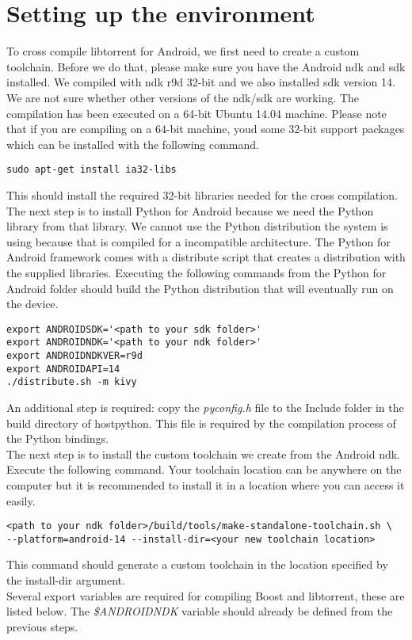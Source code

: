 \section{Setting up the environment}
	To cross compile libtorrent for Android, we first need to create a custom toolchain. Before we do that, please make sure you have the Android ndk and sdk installed. We compiled with ndk r9d 32-bit and we also installed sdk version 14. We are not sure whether other versions of the ndk/sdk are working. The compilation has been executed on a 64-bit Ubuntu 14.04 machine. Please note that if you are compiling on a 64-bit machine, youd some 32-bit support packages which can be installed with the following command.
	\begin{lstlisting}
sudo apt-get install ia32-libs
	\end{lstlisting}
	This should install the required 32-bit libraries needed for the cross compilation. The next step is to install Python for Android because we need the Python library from that library. We cannot use the Python distribution the system is using because that is compiled for a incompatible architecture. The Python for Android framework comes with a distribute script that creates a distribution with the supplied libraries. Executing the following commands from the Python for Android folder should build the Python distribution that will eventually run on the device.
	\begin{lstlisting}
export ANDROIDSDK='<path to your sdk folder>'
export ANDROIDNDK='<path to your ndk folder>'
export ANDROIDNDKVER=r9d
export ANDROIDAPI=14
./distribute.sh -m kivy
	\end{lstlisting}
	An additional step is required: copy the \emph{pyconfig.h} file to the Include folder in the build directory of hostpython. This file is required by the compilation process of the Python bindings.\\
	The next step is to install the custom toolchain we create from the Android ndk. Execute the following command. Your toolchain location can be anywhere on the computer but it is recommended to install it in a location where you can access it easily.
	\begin{lstlisting}
<path to your ndk folder>/build/tools/make-standalone-toolchain.sh \
--platform=android-14 --install-dir=<your new toolchain location>
	\end{lstlisting}
	This command should generate a custom toolchain in the location specified by the install-dir argument.\\
	Several export variables are required for compiling Boost and libtorrent, these are listed below. The \emph{\$ANDROIDNDK} variable should already be defined from the previous steps.
